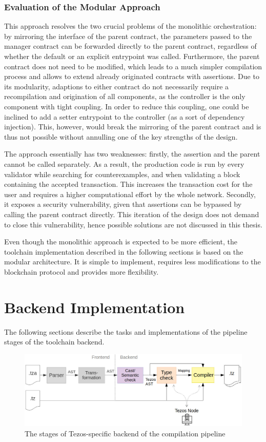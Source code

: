 \subsubsection{Evaluation of the Modular Approach}
This approach resolves the two crucial problems of the monolithic orchestration: by mirroring the interface of the parent contract, the parameters passed to the manager contract can be forwarded directly to the parent contract, regardless of whether the default or an explicit entrypoint was called. Furthermore, the parent contract does not need to be modified, which leads to a much simpler compilation process and allows to extend already originated contracts with assertions. Due to its modularity, adaptions to either contract do not necessarily require a recompilation and origination of all components, as the controller is the only component with tight coupling. In order to reduce this coupling, one could be inclined to add a setter entrypoint to the controller (as a sort of dependency injection). This, however, would break the mirroring of the parent contract and is thus not possible without annulling one of the key strengths of the design.

The approach essentially has two weaknesses: firstly, the assertion and the parent cannot be called separately. As a result, the production code is run by every validator while searching for counterexamples, and when validating a block containing the accepted transaction. This increases the transaction cost for the user and requires a higher computational effort by the whole network. Secondly, it exposes a security vulnerability, given that assertions can be bypassed by calling the parent contract directly. This iteration of the design does not demand to close this vulnerability, hence possible solutions are not discussed in this thesis.

Even though the monolithic approach is expected to be more efficient, the toolchain implementation described in the following sections is based on the modular architecture. It is simple to implement, requires less modifications to the blockchain protocol and provides more flexibility.

\section{Backend Implementation}\label{sec:backend_impl}
The following sections describe the tasks and implementations of the pipeline stages of the toolchain backend.
\begin{figure}[h]
\includegraphics[width=\linewidth]{figures/5-offline_tezos/pipeline_backend}
\caption{The stages of Tezos-specific backend of the compilation pipeline}
\label{fig:pipeline_backend}
\end{figure}

